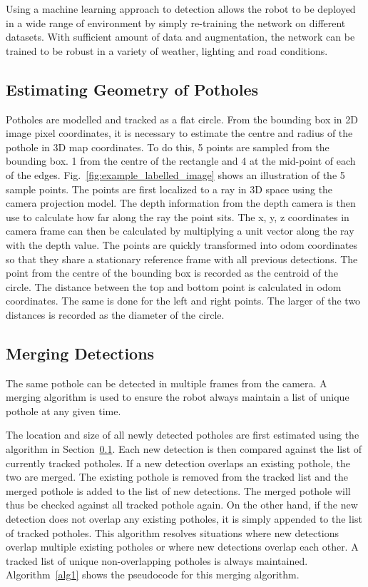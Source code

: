 \documentclass[conference]{IEEEtran}
\begin{document}
Using a machine learning approach to detection allows the robot to be deployed in a wide range of environment by simply re-training the network on different datasets. With sufficient amount of data and augmentation, the network can be trained to be robust in a variety of weather, lighting and road conditions.

\subsection{Estimating Geometry of Potholes}\label{sec:estimate_geometry}

Potholes are modelled and tracked as a flat circle. From the bounding box in 2D image pixel coordinates, it is necessary to estimate the centre and radius of the pothole in 3D map coordinates.
To do this, 5 points are sampled from the bounding box. 1 from the centre of the rectangle and 4 at the mid-point of each of the edges. Fig.~\ref{fig:example_labelled_image} shows an illustration of the 5 sample points. The points are first localized to a ray in 3D space using the camera projection model. The depth information from the depth camera is then use to calculate how far along the ray the point sits. The x, y, z coordinates in camera frame can then be calculated by multiplying a unit vector along the ray with the depth value. The points are quickly transformed into odom coordinates so that they share a stationary reference frame with all previous detections. The point from the centre of the bounding box is recorded as the centroid of the circle. The distance between the top and bottom point is calculated in odom coordinates. The same is done for the left and right points. The larger of the two distances is recorded as the diameter of the circle.

\subsection{Merging Detections}

The same pothole can be detected in multiple frames from the camera. A merging algorithm is used to ensure the robot always maintain a list of unique pothole at any given time.

The location and size of all newly detected potholes are first estimated using the algorithm in Section~\ref{sec:estimate_geometry}. Each new detection is then compared against the list of currently tracked potholes. If a new detection overlaps an existing pothole, the two are merged. The existing pothole is removed from the tracked list and the merged pothole is added to the list of new detections. The merged pothole will thus be checked against all tracked pothole again. On the other hand, if the new detection does not overlap any existing potholes, it is simply appended to the list of tracked potholes. This algorithm resolves situations where new detections overlap multiple existing potholes or where new detections overlap each other. A tracked list of unique non-overlapping potholes is always maintained. Algorithm~\ref{alg1} shows the pseudocode for this merging algorithm.
\end{document}
